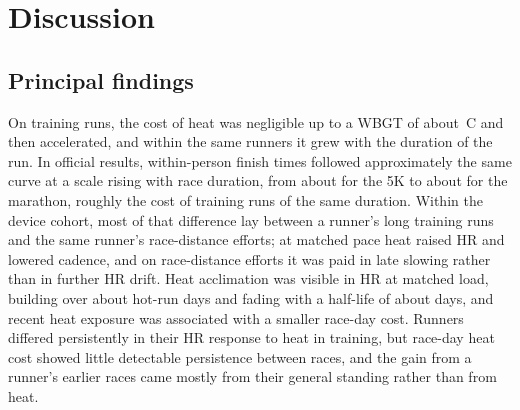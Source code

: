\documentclass[12pt]{article}
\newcommand{\degC}{\,\textdegree C}
\begin{document}
\section{Discussion}
\subsection{Principal findings}
On training runs, the cost of heat was negligible up to a WBGT of about \flatToWBGT\degC{} and then accelerated, and within the same runners it grew with the duration of the run. In official results, within-person finish times followed approximately the same curve at a scale rising with race duration, from about \alphaFiveKRound{} for the 5K to about \alphaMarRound{} for the marathon, roughly \ratioRound{} the cost of training runs of the same duration. Within the device cohort, most of that difference lay between a runner's long training runs and the same runner's race-distance efforts; at matched pace heat raised HR and lowered cadence, and on race-distance efforts it was paid in late slowing rather than in further HR drift. Heat acclimation was visible in HR at matched load, building over about \kinBuildRound{} hot-run days and fading with a half-life of about \kinDecayRound{} days, and recent heat exposure was associated with a smaller race-day cost. Runners differed persistently in their HR response to heat in training, but race-day heat cost showed little detectable persistence between races, and the gain from a runner's earlier races came mostly from their general standing rather than from heat.
\end{document}
